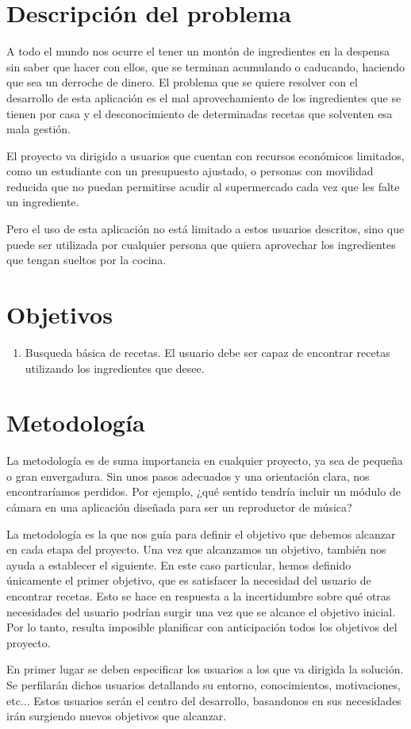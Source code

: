 \section{Descripción del problema}
A todo el mundo nos ocurre el tener un montón de ingredientes en la despensa sin saber que hacer con ellos, que se terminan acumulando o caducando, haciendo que sea un derroche de dinero. El problema que se quiere resolver con el desarrollo de esta aplicación es el mal aprovechamiento de los ingredientes que se tienen por casa y el desconocimiento de determinadas recetas que solventen esa mala gestión.

El proyecto va dirigido a usuarios que cuentan con recursos económicos limitados, como un estudiante con un presupuesto ajustado, o personas con movilidad reducida que no puedan permitirse acudir al supermercado cada vez que les falte un ingrediente. 

Pero el uso de esta aplicación no está limitado a estos usuarios descritos, sino que puede ser utilizada por cualquier persona que quiera aprovechar los ingredientes que tengan sueltos por la cocina.

\section{Objetivos}
\begin{enumerate} 
    \item Busqueda básica de recetas. El usuario debe ser capaz de encontrar recetas utilizando los ingredientes que desee.
\end{enumerate}

\section{Metodología}
La metodología es de suma importancia en cualquier proyecto, ya sea de pequeña o gran envergadura. Sin unos pasos adecuados y una orientación clara, nos encontraríamos perdidos. Por ejemplo, ¿qué sentido tendría incluir un módulo de cámara en una aplicación diseñada para ser un reproductor de música?

La metodología es la que nos guía para definir el objetivo que debemos alcanzar en cada etapa del proyecto. Una vez que alcanzamos un objetivo, también nos ayuda a establecer el siguiente. En este caso particular, hemos definido únicamente el primer objetivo, que es satisfacer la necesidad del usuario de encontrar recetas. Esto se hace en respuesta a la incertidumbre sobre qué otras necesidades del usuario podrían surgir una vez que se alcance el objetivo inicial. Por lo tanto, resulta imposible planificar con anticipación todos los objetivos del proyecto.

En primer lugar se deben especificar los usuarios a los que va dirigida la solución. Se perfilarán dichos usuarios detallando su entorno, conocimientos, motivaciones, etc... Estos usuarios serán el centro del desarrollo, basandonos en sus necesidades irán surgiendo nuevos objetivos que alcanzar.